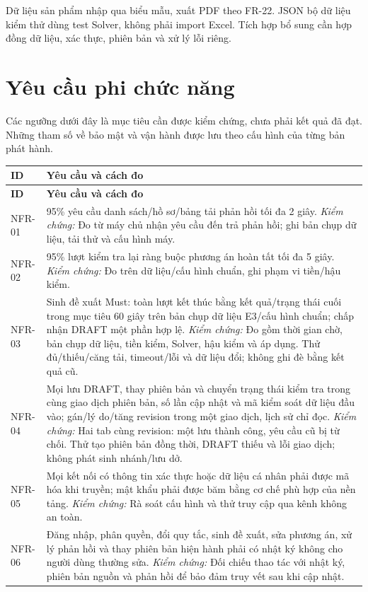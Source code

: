 \documentclass[12pt,a4paper]{report}
\begin{document}
Dữ liệu sản phẩm nhập qua biểu mẫu, xuất PDF theo FR-22. JSON bộ dữ liệu kiểm thử dùng test Solver, không phải import Excel. Tích hợp bổ sung cần hợp đồng dữ liệu, xác thực, phiên bản và xử lý lỗi riêng.

\section{Yêu cầu phi chức năng}\label{sec:nfr}
Các ngưỡng dưới đây là mục tiêu cần được kiểm chứng, chưa phải kết quả đã đạt. Những tham số về bảo mật và vận hành được lưu theo cấu hình của từng bản phát hành.

\begin{longtable}{|p{1.45cm}|p{12.5cm}|}
\hline
\textbf{ID} & \textbf{Yêu cầu và cách đo} \\\hline
\endfirsthead
\hline
\textbf{ID} & \textbf{Yêu cầu và cách đo} \\\hline
\endhead
NFR-01 & 95\% yêu cầu danh sách/hồ sơ/bảng tải phản hồi tối đa 2 giây. \textit{Kiểm chứng:} Đo từ máy chủ nhận yêu cầu đến trả phản hồi; ghi bản chụp dữ liệu, tải thử và cấu hình máy. \\\hline
NFR-02 & 95\% lượt kiểm tra lại ràng buộc phương án hoàn tất tối đa 5 giây. \textit{Kiểm chứng:} Đo trên dữ liệu/cấu hình chuẩn, ghi phạm vi tiền/hậu kiểm. \\\hline
NFR-03 & Sinh đề xuất Must: toàn lượt kết thúc bằng kết quả/trạng thái cuối trong mục tiêu 60 giây trên bản chụp dữ liệu E3/cấu hình chuẩn; chấp nhận DRAFT một phần hợp lệ. \textit{Kiểm chứng:} Đo gồm thời gian chờ, bản chụp dữ liệu, tiền kiểm, Solver, hậu kiểm và áp dụng. Thử đủ/thiếu/căng tải, timeout/lỗi và dữ liệu đổi; không ghi đè bằng kết quả cũ. \\\hline
NFR-04 & Mọi lưu DRAFT, thay phiên bản và chuyển trạng thái kiểm tra trong cùng giao dịch phiên bản, số lần cập nhật và mã kiểm soát dữ liệu đầu vào; gán/lý do/tăng revision trong một giao dịch, lịch sử chỉ đọc. \textit{Kiểm chứng:} Hai tab cùng revision: một lưu thành công, yêu cầu cũ bị từ chối. Thử tạo phiên bản đồng thời, DRAFT thiếu và lỗi giao dịch; không phát sinh nhánh/lưu dở. \\\hline
NFR-05 & Mọi kết nối có thông tin xác thực hoặc dữ liệu cá nhân phải được mã hóa khi truyền; mật khẩu phải được băm bằng cơ chế phù hợp của nền tảng. \textit{Kiểm chứng:} Rà soát cấu hình và thử truy cập qua kênh không an toàn. \\\hline
NFR-06 & Đăng nhập, phân quyền, đổi quy tắc, sinh đề xuất, sửa phương án, xử lý phản hồi và thay phiên bản hiện hành phải có nhật ký không cho người dùng thường sửa. \textit{Kiểm chứng:} Đối chiếu thao tác với nhật ký, phiên bản nguồn và phản hồi để bảo đảm truy vết sau khi cập nhật. \\\hline

\end{longtable}
\end{document}
